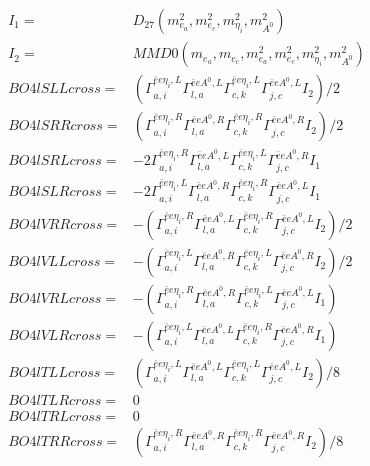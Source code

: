 \documentclass[A4,landscape]{article}
\begin{document}
\begin{align} 
I_1 = & D_{27}(m^2_{e_{{a}}}, m^2_{e_{{c}}}, m^2_{\eta_i}, m^2_{A^0}) \\ 
I_2 = & MMD0(m_{e_{{a}}}, m_{e_{{c}}}, m^2_{e_{{a}}}, m^2_{e_{{c}}}, m^2_{\eta_i}, m^2_{A^0}) \\ 
  BO4lSLLcross= & ( \Gamma^{\bar{e}e \eta_i ,L}_{a, i} \Gamma^{\bar{e}e A^0 ,L}_{l, a} \Gamma^{\bar{e}e \eta_i ,L}_{c, k} \Gamma^{\bar{e}e A^0 ,L}_{j, c} I_2)/2 \\ 
  BO4lSRRcross= & ( \Gamma^{\bar{e}e \eta_i ,R}_{a, i} \Gamma^{\bar{e}e A^0 ,R}_{l, a} \Gamma^{\bar{e}e \eta_i ,R}_{c, k} \Gamma^{\bar{e}e A^0 ,R}_{j, c} I_2)/2 \\ 
  BO4lSRLcross= & -2  \Gamma^{\bar{e}e \eta_i ,R}_{a, i} \Gamma^{\bar{e}e A^0 ,L}_{l, a} \Gamma^{\bar{e}e \eta_i ,L}_{c, k} \Gamma^{\bar{e}e A^0 ,R}_{j, c} I_1 \\ 
  BO4lSLRcross= & -2  \Gamma^{\bar{e}e \eta_i ,L}_{a, i} \Gamma^{\bar{e}e A^0 ,R}_{l, a} \Gamma^{\bar{e}e \eta_i ,R}_{c, k} \Gamma^{\bar{e}e A^0 ,L}_{j, c} I_1 \\ 
  BO4lVRRcross= & -( \Gamma^{\bar{e}e \eta_i ,R}_{a, i} \Gamma^{\bar{e}e A^0 ,L}_{l, a} \Gamma^{\bar{e}e \eta_i ,R}_{c, k} \Gamma^{\bar{e}e A^0 ,L}_{j, c} I_2)/2 \\ 
  BO4lVLLcross= & -( \Gamma^{\bar{e}e \eta_i ,L}_{a, i} \Gamma^{\bar{e}e A^0 ,R}_{l, a} \Gamma^{\bar{e}e \eta_i ,L}_{c, k} \Gamma^{\bar{e}e A^0 ,R}_{j, c} I_2)/2 \\ 
  BO4lVRLcross= & -( \Gamma^{\bar{e}e \eta_i ,R}_{a, i} \Gamma^{\bar{e}e A^0 ,R}_{l, a} \Gamma^{\bar{e}e \eta_i ,L}_{c, k} \Gamma^{\bar{e}e A^0 ,L}_{j, c} I_1) \\ 
  BO4lVLRcross= & -( \Gamma^{\bar{e}e \eta_i ,L}_{a, i} \Gamma^{\bar{e}e A^0 ,L}_{l, a} \Gamma^{\bar{e}e \eta_i ,R}_{c, k} \Gamma^{\bar{e}e A^0 ,R}_{j, c} I_1) \\ 
  BO4lTLLcross= & ( \Gamma^{\bar{e}e \eta_i ,L}_{a, i} \Gamma^{\bar{e}e A^0 ,L}_{l, a} \Gamma^{\bar{e}e \eta_i ,L}_{c, k} \Gamma^{\bar{e}e A^0 ,L}_{j, c} I_2)/8 \\ 
  BO4lTLRcross= & 0 \\ 
  BO4lTRLcross= & 0 \\ 
  BO4lTRRcross= & ( \Gamma^{\bar{e}e \eta_i ,R}_{a, i} \Gamma^{\bar{e}e A^0 ,R}_{l, a} \Gamma^{\bar{e}e \eta_i ,R}_{c, k} \Gamma^{\bar{e}e A^0 ,R}_{j, c} I_2)/8 \\ 
\end{align} 
\end{document}
